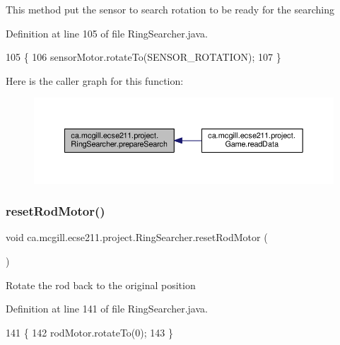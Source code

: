This method put the sensor to search rotation to be ready for the searching 

Definition at line 105 of file Ring\+Searcher.\+java.


\begin{DoxyCode}
105                               \{
106     sensorMotor.rotateTo(SENSOR\_ROTATION);
107   \}
\end{DoxyCode}
Here is the caller graph for this function\+:
\nopagebreak
\begin{figure}[H]
\begin{center}
\leavevmode
\includegraphics[width=350pt]{classca_1_1mcgill_1_1ecse211_1_1project_1_1_ring_searcher_abf31c36cadb144a4651b11f7fa37120a_icgraph}
\end{center}
\end{figure}
\mbox{\label{classca_1_1mcgill_1_1ecse211_1_1project_1_1_ring_searcher_a8b0ea0bf4cd07b6c8a090c3e9bc8eb04}} 
\subsubsection{\texorpdfstring{reset\+Rod\+Motor()}{resetRodMotor()}}
{\footnotesize\ttfamily void ca.\+mcgill.\+ecse211.\+project.\+Ring\+Searcher.\+reset\+Rod\+Motor (\begin{DoxyParamCaption}{ }\end{DoxyParamCaption})}

Rotate the rod back to the original position 

Definition at line 141 of file Ring\+Searcher.\+java.


\begin{DoxyCode}
141                               \{
142     rodMotor.rotateTo(0);
143   \}
\end{DoxyCode}
\mbox{\label{classca_1_1mcgill_1_1ecse211_1_1project_1_1_ring_searcher_ad73c50b29163d91292de418101cce21e}} 
